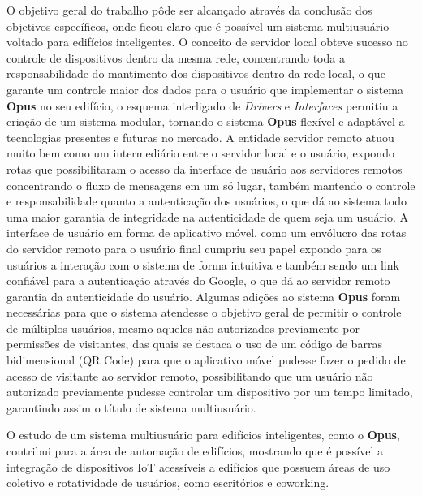 O objetivo geral do trabalho pôde ser alcançado através da conclusão dos objetivos específicos, onde ficou claro que é possível um sistema
multiusuário voltado para edifícios inteligentes.
O conceito de servidor local obteve sucesso no controle de dispositivos dentro da mesma rede, concentrando toda a responsabilidade do mantimento
dos dispositivos dentro da rede local, o que garante um controle maior dos dados para o usuário que implementar o sistema \textbf{Opus} no seu 
edifício, o esquema interligado de \emph{Drivers} e \emph{Interfaces} permitiu a criação de um sistema modular, tornando o 
sistema \textbf{Opus} flexível e adaptável a tecnologias presentes e futuras no mercado.
A entidade servidor remoto atuou muito bem como um intermediário entre o servidor local e o usuário, expondo rotas que possibilitaram o acesso da 
interface de usuário aos servidores remotos concentrando o fluxo de mensagens em um só lugar, também mantendo o controle e responsabilidade 
quanto a autenticação dos usuários, o que dá ao sistema todo uma maior garantia de integridade na autenticidade de quem seja um usuário.
A interface de usuário em forma de aplicativo móvel, como um envólucro das rotas do servidor remoto para o usuário final cumpriu seu papel
expondo para os usuários a interação com o sistema de forma intuitiva e também sendo um link confiável para a autenticação através do Google,
o que dá ao servidor remoto garantia da autenticidade do usuário.
Algumas adições ao sistema \textbf{Opus} foram necessárias para que o sistema atendesse o objetivo geral de permitir o controle de múltiplos usuários,
mesmo aqueles não autorizados previamente por permissões de visitantes, das quais se destaca o uso de um código de barras bidimensional (QR Code) para 
que o aplicativo móvel pudesse fazer o pedido de acesso de visitante ao servidor remoto, possibilitando que um usuário não autorizado
previamente pudesse controlar um dispositivo por um tempo limitado, garantindo assim o título de sistema multiusuário.

O estudo de um sistema multiusuário para edifícios inteligentes, como o \textbf{Opus}, contribui para a área de automação de edifícios,
mostrando que é possível a integração de dispositivos IoT acessíveis a edifícios que possuem áreas de uso coletivo e rotatividade de usuários,
como escritórios e coworking.



